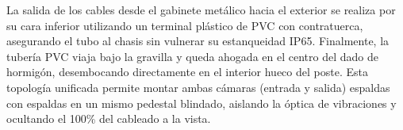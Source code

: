 La salida de los cables desde el gabinete metálico hacia el exterior se realiza por su cara inferior utilizando un terminal plástico de PVC con contratuerca, asegurando el tubo al chasis sin vulnerar su estanqueidad IP65. Finalmente, la tubería PVC viaja bajo la gravilla y queda ahogada en el centro del dado de hormigón, desembocando directamente en el interior hueco del poste. Esta topología unificada permite montar ambas cámaras (entrada y salida) espaldas con espaldas en un mismo pedestal blindado, aislando la óptica de vibraciones y ocultando el 100\% del cableado a la vista.
